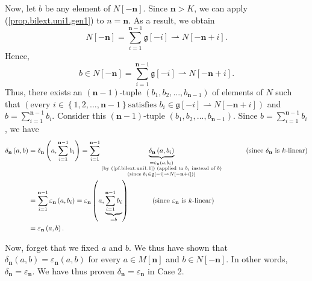 \documentclass[etingof-lie.tex]{subfiles}
\begin{document}
\begin{noncompile}
\begin{verlong}
Now, let $b$ be any element of $N\left[  -\mathbf{n}\right]  $. Since
$\mathbf{n}>K$, we can apply (\ref{prop.bilext.uni1.gen1}) to $n=\mathbf{n}$.
As a result, we obtain%
\[
N\left[  -\mathbf{n}\right]  =\sum\limits_{i=1}^{\mathbf{n}-1}\mathfrak{g}%
\left[  -i\right]  \rightharpoonup N\left[  -\mathbf{n}+i\right]  .
\]
Hence,%
\[
b\in N\left[  -\mathbf{n}\right]  =\sum\limits_{i=1}^{\mathbf{n}%
-1}\mathfrak{g}\left[  -i\right]  \rightharpoonup N\left[  -\mathbf{n}%
+i\right]  .
\]
Thus, there exists an $\left(  \mathbf{n}-1\right)  $-tuple $\left(
b_{1},b_{2},...,b_{\mathbf{n}-1}\right)  $ of elements of $N$ such that
$\left(  \text{every }i\in\left\{  1,2,...,\mathbf{n}-1\right\}  \text{
satisfies }b_{i}\in\mathfrak{g}\left[  -i\right]  \rightharpoonup N\left[
-\mathbf{n}+i\right]  \right)  $ and $b=\sum\limits_{i=1}^{\mathbf{n}-1}b_{i}%
$. Consider this $\left(  \mathbf{n}-1\right)  $-tuple $\left(  b_{1}%
,b_{2},...,b_{\mathbf{n}-1}\right)  $. Since $b=\sum\limits_{i=1}%
^{\mathbf{n}-1}b_{i}$, we have%
\begin{align*}
\delta_{\mathbf{n}}\left(  a,b\right)   &  =\delta_{\mathbf{n}}\left(
a,\sum\limits_{i=1}^{\mathbf{n}-1}b_{i}\right)  =\sum\limits_{i=1}%
^{\mathbf{n}-1}\underbrace{\delta_{\mathbf{n}}\left(  a,b_{i}\right)
}_{\substack{=\varepsilon_{\mathbf{n}}\left(  a,b_{i}\right)  \\\text{(by
(\ref{pf.bilext.uni1.1}) (applied to }b_{i}\text{ instead of }b\text{)}%
\\\text{(since }b_{i}\in\mathfrak{g}\left[  -i\right]  \rightharpoonup
N\left[  -\mathbf{n}+i\right]  \text{))}}}\ \ \ \ \ \ \ \ \ \ \left(
\text{since }\delta_{\mathbf{n}}\text{ is }k\text{-linear}\right) \\
&  =\sum\limits_{i=1}^{\mathbf{n}-1}\varepsilon_{\mathbf{n}}\left(
a,b_{i}\right)  =\varepsilon_{\mathbf{n}}\left(  a,\underbrace{\sum
\limits_{i=1}^{\mathbf{n}-1}b_{i}}_{=b}\right)  \ \ \ \ \ \ \ \ \ \ \left(
\text{since }\varepsilon_{\mathbf{n}}\text{ is }k\text{-linear}\right) \\
&  =\varepsilon_{\mathbf{n}}\left(  a,b\right)  .
\end{align*}


Now, forget that we fixed $a$ and $b$. We thus have shown that $\delta
_{\mathbf{n}}\left(  a,b\right)  =\varepsilon_{\mathbf{n}}\left(  a,b\right)
$ for every $a\in M\left[  \mathbf{n}\right]  $ and $b\in N\left[
-\mathbf{n}\right]  $. In other words, $\delta_{\mathbf{n}}=\varepsilon
_{\mathbf{n}}$. We have thus proven $\delta_{\mathbf{n}}=\varepsilon
_{\mathbf{n}}$ in Case 2.


\end{verlong}
\end{noncompile}
\end{document}
